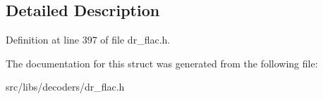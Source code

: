 \subsection{Detailed Description}


Definition at line 397 of file dr\-\_\-flac.\-h.



The documentation for this struct was generated from the following file\-:\begin{DoxyCompactItemize}
\item 
src/libs/decoders/dr\-\_\-flac.\-h\end{DoxyCompactItemize}
